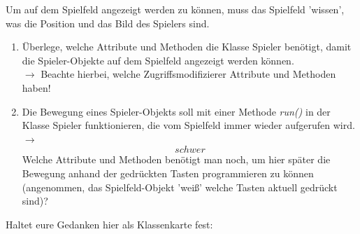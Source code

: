 \normalsize
\begin{minipage}[t]{\textwidth}

Um auf dem Spielfeld angezeigt werden zu können, muss das Spielfeld 'wissen', was die Position und das Bild des Spielers sind. 

\begin{enumerate}
    \item Überlege, welche Attribute und Methoden die Klasse Spieler benötigt, damit die Spieler-Objekte auf dem Spielfeld angezeigt werden können. \\
	$\rightarrow$ Beachte hierbei, welche Zugriffsmodifizierer Attribute und Methoden haben!
     \item Die Bewegung eines Spieler-Objekts soll mit einer Methode \emph{run()} in der Klasse Spieler funktionieren, die vom Spielfeld immer wieder aufgerufen wird. 
	$\rightarrow$ \[schwer\] Welche Attribute und Methoden benötigt man noch, um hier später die Bewegung anhand der gedrückten Tasten programmieren zu können (angenommen, das Spielfeld-Objekt 'weiß' welche Tasten aktuell gedrückt sind)?
\end{enumerate}

Haltet eure Gedanken hier als Klassenkarte fest:


\end{minipage}